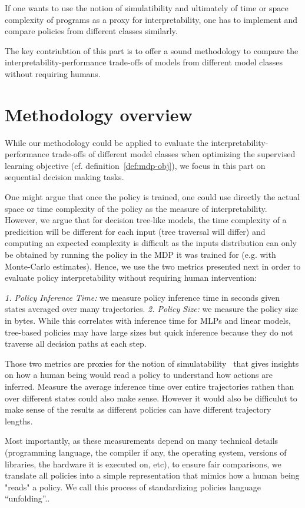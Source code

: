 If one wants to use the notion of simulatibility and ultimately of time or space complexity of programs as a proxy for interpretability, one has to implement and compare policies from different classes similarly.

The key contriubtion of this part is to offer a sound methodology to compare the interpretability-performance trade-offs of models from different model classes without requiring humans.

\section{Methodology overview}\label{sec:unfold}
While our methodology could be applied to evaluate the interpretability-performance trade-offs of different model classes when optimizing the supervised learning objective (cf. definition~\ref{def:mdp-obj}), we focus in this part on sequential decision making tasks.

One might argue that once the policy is trained, one could use directly the actual space or time complexity of the policy as the measure of interpretability.
However, we argue that for decision tree-like models, the time complexity of a predicition will be different for each input (tree traversal will differ) and computing an expected complexity is difficult as the inputs distribution can only be obtained by running the policy in the MDP it was trained for (e.g. with Monte-Carlo estimates).  
Hence, we use the two metrics presented next in order to evaluate policy interpretability without requiring human intervention:

\textit{1. Policy Inference Time:} we measure policy inference time in seconds given states averaged over many trajectories.
\textit{2. Policy Size:} we measure the policy size in bytes. While this correlates with inference time for MLPs and linear models, tree-based policies may have large sizes but quick inference because they do not traverse all decision paths at each step.

Those two metrics are proxies for the notion of simulatability~\cite{lipton} that gives insights on how a human being would read a policy to understand how actions are inferred.
Measure the average inference time over entire trajectories rathen than over different states could also make sense.
However it would also be difficulut to make sense of the results as different policies can have different trajectory lengths.

Most importantly, as these measurements depend on many technical details (programming language, the compiler if any, the operating system, versions of libraries, the hardware it is executed on, etc), to ensure fair comparisons, we translate all policies into a simple representation that mimics how a human being "reads" a policy.
We call this process of standardizing policies language ``unfolding''..

